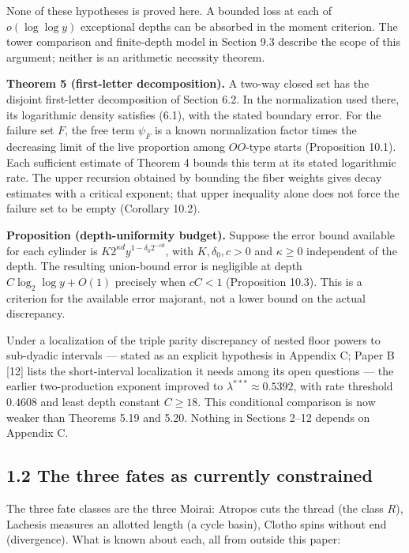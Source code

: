 \documentclass[11pt,a4paper]{article}
\begin{document}
None of these hypotheses is proved here. A bounded loss at each of
\(o(\log\log y)\) exceptional depths can be absorbed in the moment
criterion. The tower comparison and finite-depth model in Section 9.3
describe the scope of this argument; neither is an arithmetic necessity
theorem.

\textbf{Theorem 5 (first-letter decomposition).} A two-way closed set
has the disjoint first-letter decomposition of Section 6.2. In the
normalization used there, its logarithmic density satisfies (6.1), with
the stated boundary error. For the failure set \(F\), the free term
\(\psi_F\) is a known normalization factor times the decreasing limit of
the live proportion among \(OO\)-type starts (Proposition 10.1). Each
sufficient estimate of Theorem 4 bounds this term at its stated
logarithmic rate. The upper recursion obtained by bounding the fiber
weights gives decay estimates with a critical exponent; that upper
inequality alone does not force the failure set to be empty (Corollary
10.2).

\textbf{Proposition (depth-uniformity budget).} Suppose the error bound
available for each cylinder is \(K2^{\kappa d}y^{1-\delta_0 2^{-cd}}\),
with \(K,\delta_0,c>0\) and \(\kappa\ge0\) independent of the depth. The
resulting union-bound error is negligible at depth
\(C\log_2\log y+O(1)\) precisely when \(cC<1\) (Proposition 10.3). This
is a criterion for the available error majorant, not a lower bound on
the actual discrepancy.

Under a localization of the triple parity discrepancy of nested floor
powers to sub-dyadic intervals --- stated as an explicit hypothesis in
Appendix C; Paper B {[}12{]} lists the short-interval localization it
needs among its open questions --- the earlier two-production exponent
improved to \(\lambda^{***}\approx0.5392\), with rate threshold
\(0.4608\) and least depth constant \(C\ge 18\). This conditional
comparison is now weaker than Theorems 5.19 and 5.20. Nothing in
Sections 2--12 depends on Appendix C.

\subsection{1.2 The three fates as currently
constrained}\label{the-three-fates-as-currently-constrained}

The three fate classes are the three Moirai: Atropos cuts the thread
(the class \(R\)), Lachesis measures an allotted length (a cycle basin),
Clotho spins without end (divergence). What is known about each, all
from outside this paper:
\end{document}
